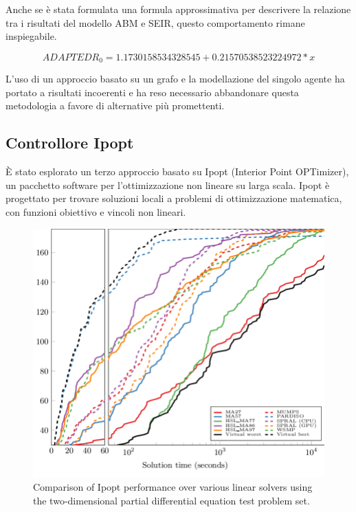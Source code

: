 Anche se è stata formulata una formula approssimativa per 
descrivere la relazione tra i risultati del modello ABM e SEIR, 
questo comportamento rimane inspiegabile. 

$$ ADAPTED R_0 = 1.1730158534328545 + 0.21570538523224972 * x $$

L'uso di un approccio basato su un grafo e la modellazione del 
singolo agente ha portato a risultati incoerenti e ha reso necessario 
abbandonare questa metodologia a favore di alternative più promettenti.
\newpage

\subsection{Controllore Ipopt}

È stato esplorato un terzo approccio basato su Ipopt 
(Interior Point OPTimizer), un pacchetto software per l'ottimizzazione 
non lineare su larga scala. Ipopt è progettato per trovare soluzioni 
locali a problemi di ottimizzazione matematica, con funzioni obiettivo e 
vincoli non lineari. \cite{Wächter2006}

\begin{figure}[H]
	\begin{center}
		\includegraphics[width=\textwidth]{img/Comparison-of-Ipopt-performance-over-various-linear-solvers-using-the-two-dimensional.png}
		\caption{Comparison of Ipopt performance over various linear solvers using the two-dimensional partial differential equation test problem set. \cite{unknown}}
		\label{fig:Ipopt_solver}	
    \end{center}
\end{figure}

